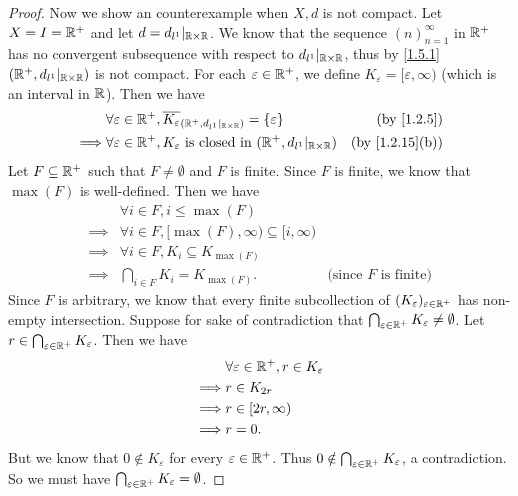 \begin{proof}
  Now we show an counterexample when \(X, d\) is not compact.
  Let \(X = I = \mathbb{R}^+\) and let \(d = d_{l^1}|_{\mathbb{R} \times \mathbb{R}}\).
  We know that the sequence \((n)_{n = 1}^\infty\) in \(\mathbb{R}^+\) has no convergent subsequence with respect to \(d_{l^1}|_{\mathbb{R} \times \mathbb{R}}\), thus by \cref{1.5.1} \((\mathbb{R}^+, d_{l^1}|_{\mathbb{R} \times \mathbb{R}})\) is not compact.
  For each \(\varepsilon \in \mathbb{R}^+\), we define \(K_\varepsilon = [\varepsilon, \infty)\) (which is an interval in \(\mathbb{R}\)).
  Then we have
  \begin{align*}
             & \forall \varepsilon \in \R^+, \overline{K_\varepsilon}_{(\R^+, d_{l^1}|_{\R \times \R})} = \{\varepsilon\} & \text{(by \cref{1.2.5})}     \\
    \implies & \forall \varepsilon \in \R^+, K_\varepsilon \text{ is closed in } (\R^+, d_{l^1}|_{\R \times \R})          & \text{(by \cref{1.2.15}(b))}
  \end{align*}
  Let \(F \subseteq \mathbb{R}^+\) such that \(F \neq \emptyset\) and \(F\) is finite.
  Since \(F\) is finite, we know that \(\max(F)\) is well-defined.
  Then we have
  \begin{align*}
             & \forall i \in F, i \leq \max(F)                                                           \\
    \implies & \forall i \in F, [\max(F), \infty) \subseteq [i, \infty)                                  \\
    \implies & \forall i \in F, K_i \subseteq K_{\max(F)}                                                \\
    \implies & \bigcap_{i \in F} K_i = K_{\max(F)}.                     & \text{(since \(F\) is finite)}
  \end{align*}
  Since \(F\) is arbitrary, we know that every finite subcollection of \((K_\varepsilon)_{\varepsilon \in \mathbb{R}^+}\) has non-empty intersection.
  Suppose for sake of contradiction that \(\bigcap_{\varepsilon \in \mathbb{R}^+} K_\varepsilon \neq \emptyset\).
  Let \(r \in \bigcap_{\varepsilon \in \mathbb{R}^+} K_\varepsilon\).
  Then we have
  \begin{align*}
             & \forall \varepsilon \in \mathbb{R}^+, r \in K_\varepsilon \\
    \implies & r \in K_{2r}                                      \\
    \implies & r \in [2r, \infty)                                \\
    \implies & r = 0.
  \end{align*}
  But we know that \(0 \notin K_\varepsilon\) for every \(\varepsilon \in \mathbb{R}^+\).
  Thus \(0 \notin \bigcap_{\varepsilon \in \mathbb{R}^+} K_\varepsilon\), a contradiction.
  So we must have \(\bigcap_{\varepsilon \in \mathbb{R}^+} K_\varepsilon = \emptyset\).
\end{proof}